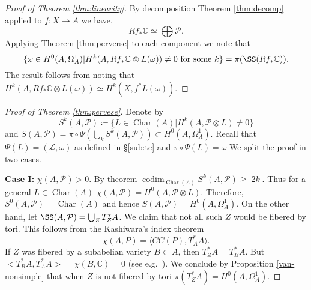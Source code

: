\documentclass[11pt,reqno]{amsart}
\theoremstyle{definition}
\theoremstyle{remark}
\theoremstyle{cited}
\theoremstyle{citeddef}
\DeclareMathOperator{\codim}{codim}              %
\DeclareMathOperator{\Char}{Char}
\newcommand{\sL}{\mathcal{L}}
\newcommand{\sP}{\mathcal{P}}
\newcommand{\bbC}{\mathbb{C}}
\begin{document}
\begin{proof}[Proof of Theorem \ref{thm:linearity}]
By decomposition Theorem \ref{thm:decomp} applied to $f\colon X\to A$
we have, 
\[Rf_*\bbC\simeq \bigoplus \sP.\]
Applying Theorem \ref{thm:perverse} to each component we note that
\[\{\omega\in H^0(A,\Omega_A^1)| H^k(A, Rf_*\bbC\otimes L(\omega)) \neq 0 \text{ for some } k\} = \pi(\SS(Rf_*\bbC)).\]
The result follows from noting that $H^k(A, Rf_*\bbC\otimes L(\omega)) \simeq H^k(X, f^*L(\omega))$.
\end{proof}

\begin{proof}[Proof of Theorem \ref{thm:pervese}]
Denote by
\[S^k(A,\sP)\coloneqq \{L\in \Char(A)| H^k(A, \sP\otimes L) \neq 0\}\]
and $S(A,\sP) = \pi\circ\Psi(\bigcup_k S^k(A,\sP))\subset H^0(A,\Omega_A^1)$. Recall that $\Psi(L) = (\sL, \omega)$
as defined in \S \ref{sub:tc} and $\pi\circ\Psi(L) = \omega$
We split the proof in two cases.

\noindent \textbf{Case I: }$\chi(A, \sP)>0$. By theorem \cite[Theorem 7.4]{sch}
$\codim_{\Char(A)} S^k(A,\sP) \geq |2k|$. Thus for a general $L \in \Char(A)$
$\chi(A, \sP) = H^0(A, \sP\otimes L)$. Therefore, $S^0(A,\sP) = \Char(A)$ and hence $S(A, \sP) = H^0(A, \Omega_A^1)$.
On the other hand, let $\SS(A, \sP) = \bigcup_Z T^*_ZA$. We claim that not all such $Z$ would be fibered by tori. This follows from
the Kashiwara's index theorem 
\[\chi(A,P) = \langle CC(P), T^*_AA\rangle.\]
If $Z$ was fibered by a subabelian variety $B\subset A$, then $T^*_ZA = T^*_BA$. But $<T^*_BA, T^*_AA> = \chi(B, \bbC) = 0$ (see e.g.\ \cite[p.\ 124]{Dim}).
We conclude by Proposition \ref{van-nonsimple} that when $Z$ is not fibered by tori $\pi(T^*_ZA) = H^0(A,\Omega_A^1)$. 


\end{proof}
\end{document}
